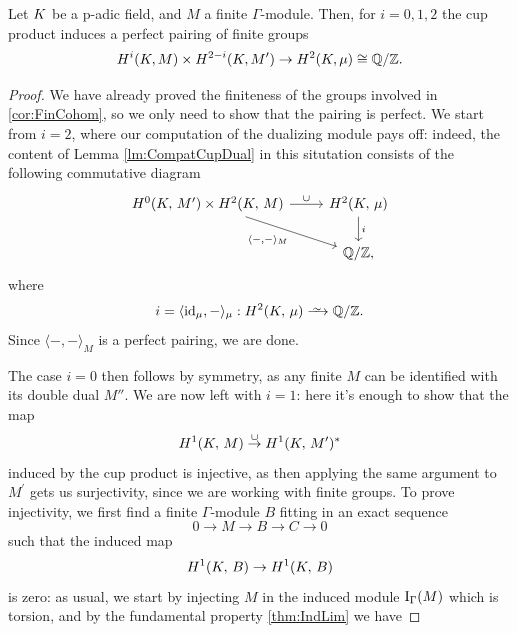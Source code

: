 \documentclass[a4paper, oneside]{memoir}
\begin{document}
\begin{theorem}
    Let $K$ be a p-adic field, and $M$ a finite $\Gamma$-module.
    Then, for $i=0,1,2$ the cup product induces a perfect pairing of finite groups
    \begin{equation*}
        H^i(K, M) \times H^{2-i}(K, M^{\prime}) \to H^2(K, \mu) \cong \mathbb{Q}/\mathbb{Z}.
    \end{equation*}
\end{theorem}
\begin{proof}
    We have already proved the finiteness of the groups involved in \ref{cor:FinCohom}, so we only need to show that the pairing is perfect.
    We start from $i=2$, where our computation of the dualizing module pays off: indeed, the content of Lemma \ref{lm:CompatCupDual}
    in this situtation consists of the following commutative diagram
    \begin{equation*}
        \begin{tikzcd}
            {\H{0}{\K}{M^\prime}  \times \HH{\K}{M}} \ar[swap, rd, "\langle - {,} - \rangle_M "] \ar[r, "\cup"] & \HH{\K}{\mu} \ar[d, "i"] \\
            & \Q/\Z,
        \end{tikzcd}
    \end{equation*}
    where
    \[
        i = \langle \id_{\mu}, - \rangle_\mu : \H{2}{\K}{\mu} \Iso \Q/\Z.
    \]
    Since \(\langle -{,}- \rangle_M\) is a perfect pairing, we are done.

    The case $i=0$ then follows by symmetry, as any finite $M$ can be identified with its double dual $M''$.
    We are now left with $i=1$: here it's enough to show that the map
    \[
        H^{1}( K, \, M ) \overset{\cup}{\to} H^{1}( K, \, M^\prime )^*
    \]
    induced by the cup product is injective, as then applying the same argument to $M^\prime$ gets us surjectivity, since we are working with finite groups.
    To prove injectivity, we first find a finite $\Gamma$-module $B$ fitting in an exact sequence
    \begin{equation}\label{eq:InjSeq}
        0\to M\to B\to C\to 0
    \end{equation}
    such that the induced map
    \[
        H^{1}( K, \, B )\to H^{1}( K, \, B )
    \]
    is zero:
    as usual, we start by injecting $M$ in the induced module $\mathrm{I}_{\Gamma}(M)$ which is torsion, and by the fundamental property \ref{thm:IndLim} we have


\end{proof}
\end{document}
